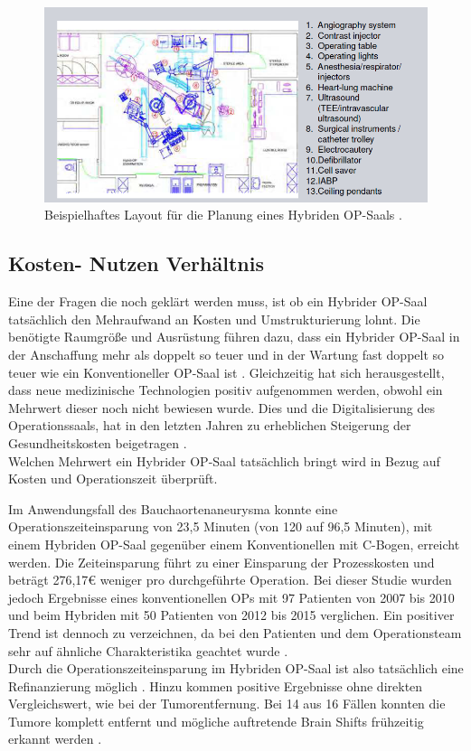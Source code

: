 \begin{figure} [t!]
	\includegraphics[scale = 0.7]{Content/Pictures/roomplanning.png}
	\caption{Beispielhaftes Layout für die Planung eines Hybriden OP-Saals \cite{HybridOR}.}
	\label{fig:roomplanning}
\end{figure}

\subsection{Kosten- Nutzen Verhältnis}

Eine der Fragen die noch geklärt werden muss, ist ob ein Hybrider OP-Saal tatsächlich den Mehraufwand an Kosten und Umstrukturierung lohnt. Die benötigte Raumgröße und Ausrüstung führen dazu, dass ein Hybrider OP-Saal in der Anschaffung mehr als doppelt so teuer und in der Wartung fast doppelt so teuer wie ein Konventioneller OP-Saal ist \cite{HybridOR}. Gleichzeitig hat sich herausgestellt, dass neue medizinische Technologien positiv aufgenommen werden, obwohl ein Mehrwert dieser noch nicht bewiesen wurde. Dies und die Digitalisierung des Operationssaals, hat in den letzten Jahren zu erheblichen Steigerung der Gesundheitskosten beigetragen \cite{DerDigitaleOperationssaal}. \\
Welchen Mehrwert ein Hybrider OP-Saal tatsächlich bringt wird in Bezug auf Kosten und Operationszeit überprüft.

Im Anwendungsfall des Bauchaortenaneurysma konnte eine Operationszeiteinsparung von 23,5 Minuten (von 120 auf 96,5 Minuten), mit einem Hybriden OP-Saal gegenüber einem Konventionellen mit C-Bogen, erreicht werden. Die Zeiteinsparung führt zu einer Einsparung der Prozesskosten und beträgt 276,17€ weniger pro durchgeführte Operation. Bei dieser Studie wurden jedoch Ergebnisse eines konventionellen OPs mit 97 Patienten von 2007 bis 2010 und beim Hybriden mit 50 Patienten von 2012 bis 2015 verglichen. Ein positiver Trend ist dennoch zu verzeichnen, da bei den Patienten und dem Operationsteam sehr auf ähnliche Charakteristika geachtet wurde \cite{HybriderVsKonventioneller}.\\
Durch die Operationszeiteinsparung im Hybriden OP-Saal ist also tatsächlich eine Refinanzierung möglich \cite{HybriderVsKonventioneller}. Hinzu kommen positive Ergebnisse ohne direkten Vergleichswert, wie bei der Tumorentfernung. Bei 14 aus 16 Fällen konnten die Tumore komplett entfernt und mögliche auftretende Brain Shifts frühzeitig erkannt werden \cite{BrainShiftInTumorResection}.

